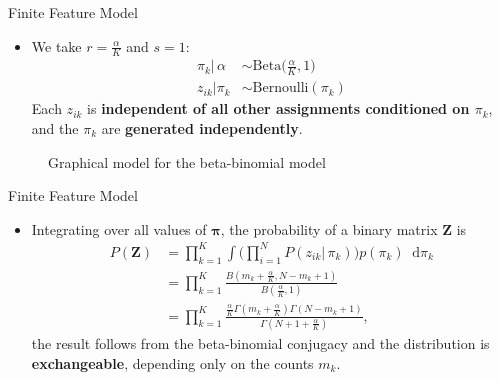 \documentclass[aspectratio=169,xcolor=dvipsnames]{beamer}
\newcommand*\diff{\mathop{}\!\mathrm{d}}
\newcommand{\vecpi}{\boldsymbol{\pi}}
\newcommand{\matz}{\textbf{Z}}
\newcommand{\aOverK}{\frac{\alpha}{K}}
\begin{document}
\begin{frame}{Finite Feature Model}
\setlength{\leftmargini}{0.2cm}
\begin{itemize}
\item We  take $r = \aOverK$ and $s=1$:
\begin{align*}
    \pi_k | \, \alpha &\sim \text{Beta}\Big(\aOverK,1 ) \\ z_{ik} | \pi_k & \sim \text{Bernoulli}(\pi_k)
\end{align*}
Each $z_{ik}$ is\textbf{ independent of all other assignments conditioned on $\pi_k$}, and the $\pi_k$ are \textbf{generated independently}.
\end{itemize}
\pause
\vspace{1pt}
\begin{figure}
\begin{center} 
\caption{Graphical model for the beta-binomial model}
\label{fig:beta-binomial}
\end{center}
\end{figure}
\end{frame}
\begin{frame}{Finite Feature Model}
\setlength{\leftmargini}{0.2cm}
\begin{itemize}
\item Integrating over all values of $\vecpi$,  the probability of a binary matrix $\matz$ is
\begin{align}
    P(\matz) &= \prod_{k=1}^{K} \int  \bigg( \prod_{i=1}^{N}P(z_{ik}| \, \pi_k)\bigg)p(\pi_k) \diff \pi_k \nonumber \\
    &= \prod_{k=1}^{K} \frac{B(m_k + \aOverK, N-m_k+1)}{B(\aOverK,1)} \nonumber \\
    &= \prod_{k=1}^{K} \frac{\aOverK\Gamma(m_k+\aOverK)\Gamma(N-m_k+1)}{\Gamma(N+1+\aOverK)}, \label{eq:finiteFeature}
\end{align}
\pause
the result follows from the beta-binomial conjugacy and the distribution is  \textbf{exchangeable}, depending only on the counts $m_k$.
\end{itemize}
\end{frame}
\end{document}
